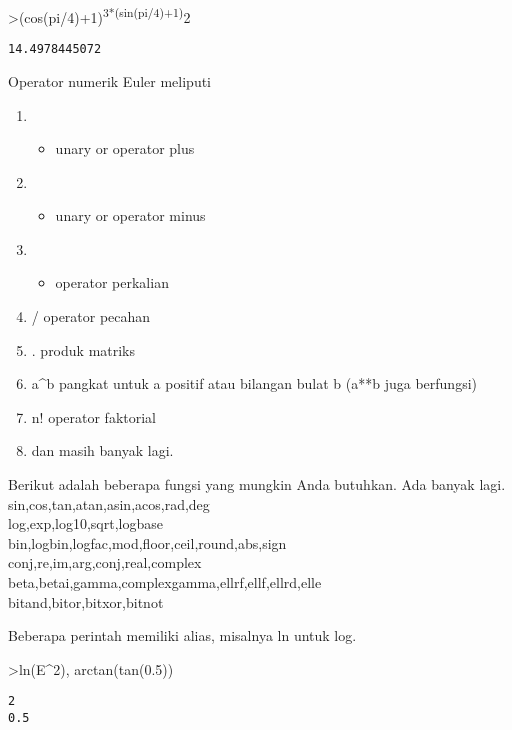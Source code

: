\documentclass[
]{book}
\providecommand{\tightlist}{%
  \setlength{\itemsep}{0pt}\setlength{\parskip}{0pt}}
\begin{document}
\textgreater(cos(pi/4)+1)\textsuperscript{3*(sin(pi/4)+1)}2

\begin{verbatim}
14.4978445072
\end{verbatim}

Operator numerik Euler meliputi

\begin{enumerate}
\def\labelenumi{\arabic{enumi}.}
\tightlist
\item
  \begin{itemize}
  \tightlist
  \item
    unary or operator plus\\
  \end{itemize}
\item
  \begin{itemize}
  \tightlist
  \item
    unary or operator minus
  \end{itemize}
\item
  \begin{itemize}
  \tightlist
  \item
    operator perkalian\\
  \end{itemize}
\item
  / operator pecahan\\
\item
  . produk matriks\\
\item
  a\^{}b pangkat untuk a positif atau bilangan bulat b (a**b juga berfungsi)
\item
  n! operator faktorial
\item
  dan masih banyak lagi.
\end{enumerate}

Berikut adalah beberapa fungsi yang mungkin Anda butuhkan. Ada banyak lagi. sin,cos,tan,atan,asin,acos,rad,deg\\
log,exp,log10,sqrt,logbase\\
bin,logbin,logfac,mod,floor,ceil,round,abs,sign\\
conj,re,im,arg,conj,real,complex\\
beta,betai,gamma,complexgamma,ellrf,ellf,ellrd,elle\\
bitand,bitor,bitxor,bitnot

Beberapa perintah memiliki alias, misalnya ln untuk log.

\textgreater ln(E\^{}2), arctan(tan(0.5))

\begin{verbatim}
2
0.5
\end{verbatim}
\end{document}
